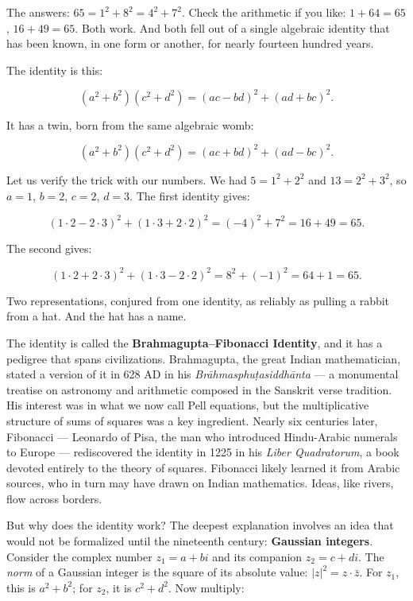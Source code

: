 \documentclass[11pt,twoside,openright]{book}
\theoremstyle{definition}
\theoremstyle{remark}
\begin{document}
The answers: $65 = 1^2 + 8^2 = 4^2 + 7^2$. Check the arithmetic if you like: $1 + 64 = 65$, $16 + 49 = 65$. Both work. And both fell out of a single algebraic identity that has been known, in one form or another, for nearly fourteen hundred years.

The identity is this:

\[(a^2 + b^2)(c^2 + d^2) = (ac - bd)^2 + (ad + bc)^2.\]

It has a twin, born from the same algebraic womb:

\[(a^2 + b^2)(c^2 + d^2) = (ac + bd)^2 + (ad - bc)^2.\]

Let us verify the trick with our numbers. We had $5 = 1^2 + 2^2$ and $13 = 2^2 + 3^2$, so $a = 1$, $b = 2$, $c = 2$, $d = 3$. The first identity gives:

\[(1 \cdot 2 - 2 \cdot 3)^2 + (1 \cdot 3 + 2 \cdot 2)^2 = (-4)^2 + 7^2 = 16 + 49 = 65.\]

The second gives:

\[(1 \cdot 2 + 2 \cdot 3)^2 + (1 \cdot 3 - 2 \cdot 2)^2 = 8^2 + (-1)^2 = 64 + 1 = 65.\]

Two representations, conjured from one identity, as reliably as pulling a rabbit from a hat. And the hat has a name.


The identity is called the \textbf{Brahmagupta--Fibonacci Identity}, and it has a pedigree that spans civilizations. Brahmagupta, the great Indian mathematician, stated a version of it in 628 AD in his \textit{Brāhmasphuṭasiddhānta} --- a monumental treatise on astronomy and arithmetic composed in the Sanskrit verse tradition. His interest was in what we now call Pell equations, but the multiplicative structure of sums of squares was a key ingredient. Nearly six centuries later, Fibonacci --- Leonardo of Pisa, the man who introduced Hindu-Arabic numerals to Europe --- rediscovered the identity in 1225 in his \textit{Liber Quadratorum}, a book devoted entirely to the theory of squares. Fibonacci likely learned it from Arabic sources, who in turn may have drawn on Indian mathematics. Ideas, like rivers, flow across borders.

But why does the identity work? The deepest explanation involves an idea that would not be formalized until the nineteenth century: \textbf{Gaussian integers}. Consider the complex number $z_1 = a + bi$ and its companion $z_2 = c + di$. The \textit{norm} of a Gaussian integer is the square of its absolute value: $|z|^2 = z \cdot \bar{z}$. For $z_1$, this is $a^2 + b^2$; for $z_2$, it is $c^2 + d^2$. Now multiply:
\end{document}
